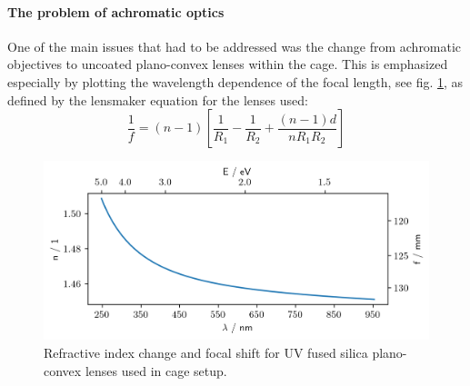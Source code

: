 \documentclass[twoside,openright,listof=numbered]{scrreprt}
\begin{document}
\paragraph{The problem of achromatic optics}
One of the main issues that had to be addressed was the change from achromatic objectives to uncoated plano-convex lenses within the cage.
This is emphasized especially by plotting the wavelength dependence of the focal length, see fig. \ref{fig:ChromFocalShift}, as defined by the lensmaker equation for the lenses used:
\begin{equation}
\frac{1}{f} = (n-1) \left[\frac{1}{R_1} - \frac{1}{R_2} + \frac{(n-1)d}{n R_1 R_2}\right]
\end{equation}
\begin{figure}[h]
\centering
\includegraphics[scale = 1]{images/ChromaticFocalShiftandDispersionUVFS.png} 
\caption{Refractive index change and focal shift for UV fused silica plano-convex lenses used in cage setup.\label{fig:ChromFocalShift}}
\end{figure}
\end{document}
